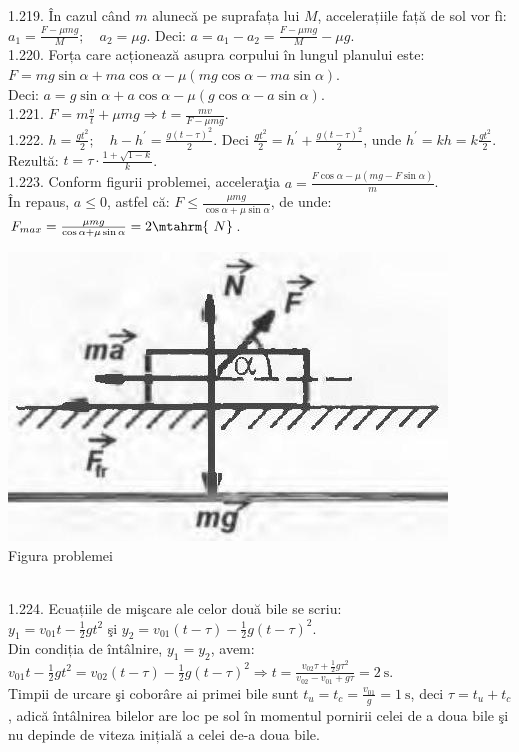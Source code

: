 1.219. În cazul când $m$ alunecă pe suprafața lui $M$, accelerațiile față de sol vor fì: $a_{1}=\frac{F-\mu m g}{M}; \quad a_{2}=\mu g$. Deci: $a=a_{1}-a_{2}=\frac{F-\mu m g}{M}-\mu g$.\\

1.220. Forța care acționează asupra corpului în lungul planului este:\\ $F=m g \sin \alpha+m a \cos \alpha-\mu(m g \cos \alpha-m a \sin \alpha)$.\\ Deci: $a=g \sin \alpha+a \cos \alpha-\mu(g \cos \alpha-a \sin \alpha)$.\\

1.221. $F=m \frac{v}{t}+\mu m g \Rightarrow t=\frac{m v}{F-\mu m g}$.\\

1.222. $h=\frac{g t^{2}}{2}; \quad h-h^{\prime}=\frac{g(t-\tau)^{2}}{2}$. Deci $\frac{g t^{2}}{2}=h^{\prime}+\frac{g(t-\tau)^{2}}{2}$, unde $h^{\prime}=k h=k \frac{g t^{2}}{2}$.\\ Rezultă: $t=\tau \cdot \frac{1+\sqrt{1-k}}{k}$.\\

1.223. Conform figurii problemei, acceleraţia $a=\frac{F \cos \alpha-\mu(m g-F \sin \alpha)}{m}$.\\ În repaus, $a \leq 0$, astfel că: $F \leq \frac{\mu m g}{\cos \alpha+\mu \sin \alpha}$, de unde:\\ $F_{max}=\frac{\mu m g}{\cos \alpha+\mu \sin \alpha}=2 \mtahrm{~N}$.\\ \begin{center} \includegraphics[width=0.4\linewidth]{images/2025_07_01_5b3ff9fa0d508c8e9f17g-246}\\ Figura problemei \end{center}\\

1.224. Ecuațiile de mişcare ale celor două bile se scriu:\\ $y_{1}=v_{01} t-\frac{1}{2} g t^{2}$ şi $y_{2}=v_{01}(t-\tau)-\frac{1}{2} g(t-\tau)^{2}$.\\ Din condiția de întâlnire, $y_{1}=y_{2}$, avem:\\ $v_{01} t-\frac{1}{2} g t^{2}=v_{02}(t-\tau)-\frac{1}{2} g(t-\tau)^{2} \Rightarrow t=\frac{v_{02} \tau+\frac{1}{2} g \tau^{2}}{v_{02}-v_{01}+g \tau}=2 \mathrm{~s}$.\\ Timpii de urcare şi coborâre ai primei bile sunt $t_{u}=t_{c}=\frac{v_{01}}{g}=1 \mathrm{~s}$, deci $\tau=t_{u}+t_{c}$, adică întâlnirea bilelor are loc pe sol în momentul pornirii celei de a doua bile şi nu depinde de viteza inițială a celei de-a doua bile.\\

